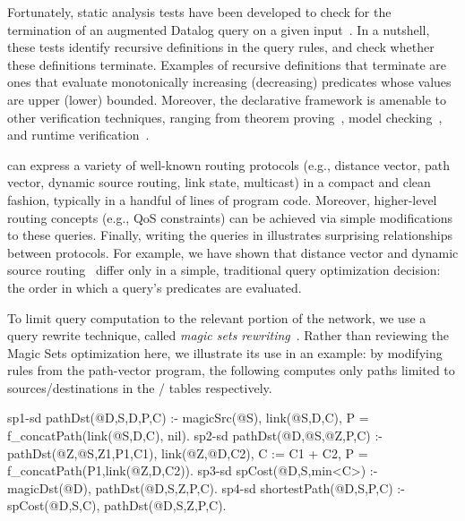 Fortunately, static analysis tests have been developed to check for
the termination of an augmented Datalog query on a given
input~\cite{krs}. In a nutshell, these tests identify recursive
definitions in the query rules, and check whether these definitions
terminate. Examples of recursive definitions that terminate are ones
that evaluate monotonically increasing (decreasing) predicates whose
values are upper (lower) bounded. Moreover, the declarative framework is
amenable to other verification techniques, ranging from theorem
proving~\cite{dnv}, model checking~\cite{card}, and runtime
verification~\cite{singhEurosys}.






\Dlog can express a variety of well-known routing protocols (e.g.,
distance vector, path vector, dynamic source routing, link state,
multicast) in a compact and clean fashion, typically in a handful of
lines of program code. Moreover, higher-level routing concepts (e.g.,
QoS constraints) can be achieved via simple modifications to these
queries. Finally, writing the queries in \Dlog illustrates surprising
relationships between protocols.  For example, we have shown that
distance vector and dynamic source routing~\cite{dsr} differ only in a
simple, traditional query optimization decision: the order in which a
query's predicates are evaluated.

To limit query computation to the relevant portion of the network, we
use a query rewrite technique, called {\em magic sets
  rewriting}~\cite{oldMagic}. Rather than reviewing the Magic Sets
optimization here, we illustrate its use in an example: by modifying
rules  from the path-vector program, the following computes only
paths limited to sources/destinations in the
/ tables respectively.

\begin{NDlog}
sp1-sd pathDst(@D,S,D,P,C) :- magicSrc(@S), link(@S,D,C),
          P = f\_concatPath(link(@S,D,C), nil). 
sp2-sd pathDst(@D,@S,@Z,P,C) :- pathDst(@Z,@S,Z1,P1,C1),
          link(@Z,@D,C2), C := C1 + C2, 
          P = f\_concatPath(P1,link(@Z,D,C2)).
sp3-sd spCost(@D,S,min<C>) :- magicDst(@D), pathDst(@D,S,Z,P,C).
sp4-sd shortestPath(@D,S,P,C) :- spCost(@D,S,C),
           pathDst(@D,S,Z,P,C).
\end{NDlog}

